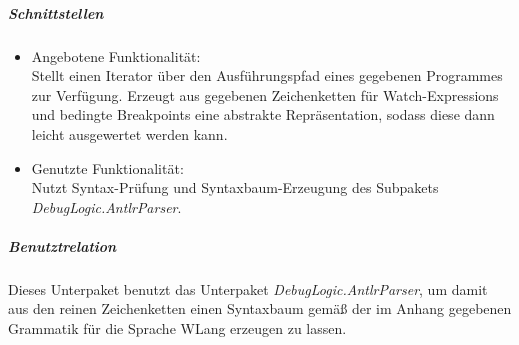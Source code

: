 \documentclass[parskip=full]{scrartcl}
\begin{document}

\subparagraph{Schnittstellen}
\begin{itemize}
\item Angebotene Funktionalität:\\
Stellt einen Iterator über den Ausführungspfad eines gegebenen Programmes zur Verfügung. Erzeugt aus gegebenen Zeichenketten für Watch-Expressions und bedingte Breakpoints eine abstrakte Repräsentation, sodass diese dann leicht ausgewertet werden kann.

\item Genutzte Funktionalität:\\
Nutzt Syntax-Prüfung und Syntaxbaum-Erzeugung des Subpakets \textit{DebugLogic.AntlrParser}. 
\end{itemize}

\subparagraph{Benutztrelation} 
Dieses Unterpaket benutzt das Unterpaket \textit{DebugLogic.AntlrParser}, um damit aus den reinen Zeichenketten einen Syntaxbaum gemäß der im Anhang gegebenen Grammatik für die Sprache WLang erzeugen zu lassen.
\end{document}
